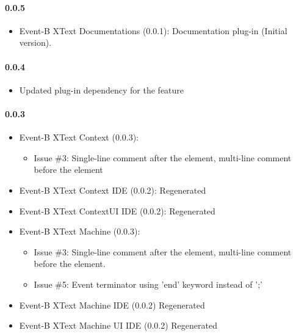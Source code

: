 \paragraph{0.0.5}
\begin{itemize}
\item Event-B XText Documentations (0.0.1): Documentation plug-in (Initial version).
\end{itemize}

\paragraph{0.0.4}
\begin{itemize}
\item Updated plug-in dependency for the feature
\end{itemize}

\paragraph{0.0.3}
\begin{itemize}
\item Event-B XText Context (0.0.3):
  \begin{itemize}
  \item Issue \#3: Single-line comment after the element, multi-line comment before
    the element
  \end{itemize}

\item Event-B XText Context IDE (0.0.2): Regenerated
 
\item Event-B XText ContextUI IDE (0.0.2): Regenerated

\item Event-B XText Machine (0.0.3):
  \begin{itemize}
  \item Issue \#3: Single-line comment after the element, multi-line comment before
    the element.

  \item Issue \#5: Event terminator using 'end' keyword instead of ';'
  \end{itemize}

\item Event-B XText Machine IDE (0.0.2) Regenerated
  
\item Event-B XText Machine UI IDE (0.0.2) Regenerated
\end{itemize}


